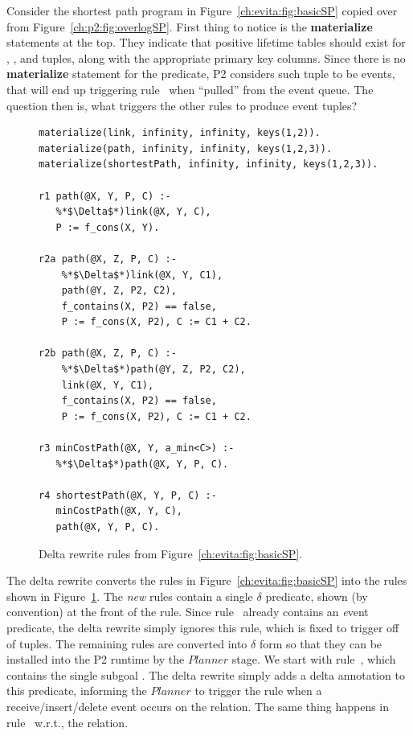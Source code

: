 Consider the shortest path program in Figure~\ref{ch:evita:fig:basicSP} copied
over from Figure~\ref{ch:p2:fig:overlogSP}.  First thing to notice is the {\bf
materialize} statements at the top.  They indicate that positive lifetime
tables should exist for , , and  tuples,
along with the appropriate primary key columns.  Since there is no {\bf
materialize} statement for the  predicate, P2 considers such
tuple to be events, that will end up triggering rule~ when ``pulled''
from the event queue.  The question then is, what triggers the other rules to
produce  event tuples?

\begin{figure}[!t]
\ssp
\centering
\begin{lstlisting}
materialize(link, infinity, infinity, keys(1,2)).
materialize(path, infinity, infinity, keys(1,2,3)).
materialize(shortestPath, infinity, infinity, keys(1,2,3)).

r1 path(@X, Y, P, C) :-
   %*$\Delta$*)link(@X, Y, C), 
   P := f_cons(X, Y).

r2a path(@X, Z, P, C) :-
    %*$\Delta$*)link(@X, Y, C1), 
    path(@Y, Z, P2, C2),
    f_contains(X, P2) == false,
    P := f_cons(X, P2), C := C1 + C2.

r2b path(@X, Z, P, C) :-
    %*$\Delta$*)path(@Y, Z, P2, C2), 
    link(@X, Y, C1),
    f_contains(X, P2) == false,
    P := f_cons(X, P2), C := C1 + C2.

r3 minCostPath(@X, Y, a_min<C>) :-
   %*$\Delta$*)path(@X, Y, P, C).

r4 shortestPath(@X, Y, P, C) :-
   minCostPath(@X, Y, C), 
   path(@X, Y, P, C).
\end{lstlisting}
\caption{\label{ch:evita:fig:basicSPDelta}Delta rewrite rules from Figure~\ref{ch:evita:fig:basicSP}.}
\end{figure}

The delta rewrite converts the rules in Figure~\ref{ch:evita:fig:basicSP} into
the rules shown in Figure~\ref{ch:evita:fig:basicSPDelta}.  The {\em new} rules
contain a single $\delta$ predicate, shown (by convention) at the front of the
rule.  Since rule~ already contains an {\emph event} predicate, the
delta rewrite simply ignores this rule, which is fixed to trigger off of
 tuples.  The remaining rules are converted into $\delta$ form
so that they can be installed into the P2 runtime by the $Planner$ stage.  We
start with rule~, which contains the single subgoal .  The
delta rewrite simply adds a delta annotation to this predicate, informing the
$Planner$ to trigger the rule when a receive/insert/delete event occurs on the
 relation.  The same thing happens in rule~ w.r.t., the
 relation.

